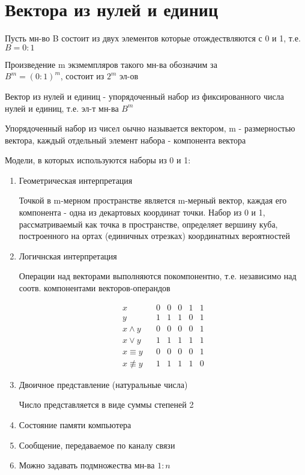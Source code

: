 \documentclass[discrete.tex]{subfiles}
\begin{document}
  \section{Вектора из нулей и единиц}

  Пусть мн-во B состоит из двух элементов которые отождествляются с 0 и 1, т.е. $B = 0:1$

  Произведение m экзмемпляров такого мн-ва обозначим за\\
  $B^m=(0:1)^m$, состоит из $2^m$ эл-ов
  \begin{definition}
    Вектор из нулей и единиц - упорядоченный набор из фиксированного числа нулей и единиц, т.е. эл-т мн-ва $B^m$
  \end{definition}
  Упорядоченный набор из чисел оычно называется вектором, m - размерностью вектора, каждый отдельный элемент набора - компонента вектора
  \begin{remark}
    Модели, в которых используются наборы из 0 и 1:
    \begin{enumerate}
      \item Геометрическая интерпретация

      Точкой в m-мерном пространстве является m-мерный вектор, каждая его компонента - одна из декартовых координат точки. Набор из 0 и 1, рассматриваемый как точка в пространстве, определяет вершину куба, построенного на ортах (единичных отрезках) координатных вероятностей
      \item Логичнская интерпретация

      Операции над векторами выполняются покомпонентно, т.е. независимо над соотв. компонентами векторов-операндов
      \begin{Example}
        \[\begin{matrix}
          x && 0 & 0 & 0 & 1 & 1\\
          y && 1 & 1 & 1 & 0 & 1\\
          x \wedge y && 0 & 0 & 0 & 0 & 1\\
          x \vee y && 1 & 1 & 1 & 1 & 1\\
          x \equiv y && 0 & 0 & 0 & 0 & 1\\
          x \not \equiv y && 1 & 1 & 1 & 1 & 0
        \end{matrix}\]
      \end{Example}
      \item Двоичное представление (натуральные числа)

      Число представляется в виде суммы степеней 2
      \item Состояние памяти компьютера
      \item Сообщение, передаваемое по каналу связи
      \item Можно задавать подмножества мн-ва $1:n$
    \end{enumerate}
  \end{remark}
\end{document}
